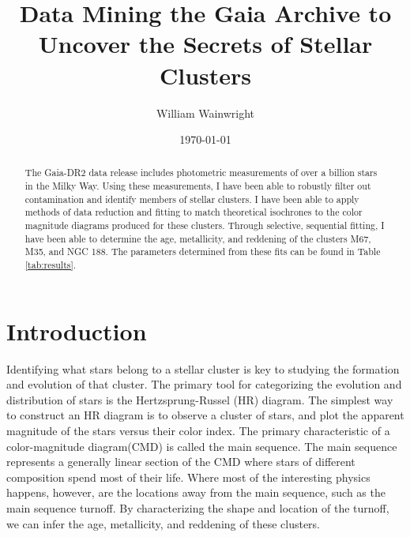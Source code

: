 \documentclass[aps,prb,twocolumn,groupedaddress,nofootinbib,floatfix]{revtex4-1}
\begin{document}
%
\title{Data Mining the Gaia Archive to Uncover the Secrets of Stellar Clusters}

%
\author{William Wainwright}
%
%
%
%

\date{\today}

\begin{abstract} The Gaia-DR2 data release includes photometric measurements of over a billion stars in the Milky Way. Using these measurements, I have been able to robustly filter out contamination and identify members of stellar clusters. I have been able to apply methods of data reduction and fitting to match theoretical isochrones to the color magnitude diagrams produced for these clusters. Through selective, sequential fitting, I have been able to determine the age, metallicity, and reddening of the clusters M67, M35, and NGC 188. The parameters determined from these fits can be found in Table \ref{tab:results}.
\end{abstract}

\maketitle

\section*{Introduction}
Identifying what stars belong to a stellar cluster is key to studying the formation and evolution of that cluster. The primary tool for categorizing the evolution and distribution of stars is the Hertzsprung-Russel (HR) diagram. The simplest way to construct an HR diagram is to observe a cluster of stars, and plot the apparent magnitude of the stars versus their color index. The primary characteristic of a color-magnitude diagram(CMD) is called the main sequence. The main sequence represents a generally linear section of the CMD where stars of different composition spend most of their life. Where most of the interesting physics happens, however, are the locations away from the main sequence, such as the main sequence turnoff. By characterizing the shape and location of the turnoff, we can infer the age, metallicity, and reddening of these clusters.
\end{document}
